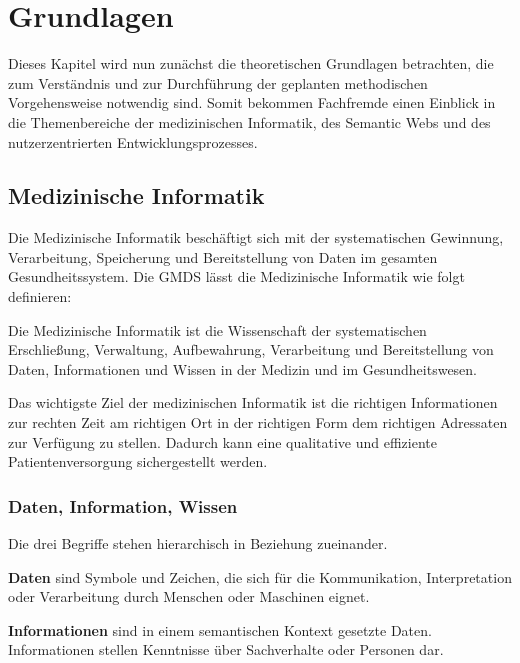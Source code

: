 \chapter{Grundlagen}\label{ch:preliminaries}

Dieses Kapitel wird nun zunächst die theoretischen Grundlagen betrachten, die zum Verständnis und zur Durchführung der geplanten methodischen Vorgehensweise notwendig sind.
Somit bekommen Fachfremde einen Einblick in die Themenbereiche der medizinischen Informatik, des Semantic Webs und des nutzerzentrierten Entwicklungsprozesses.

\section{Medizinische Informatik}\label{sec:mi}

Die Medizinische Informatik beschäftigt sich mit der systematischen Gewinnung, Verarbeitung, Speicherung und Bereitstellung von Daten im gesamten Gesundheitssystem. 
Die \ac{GMDS} lässt die Medizinische Informatik wie folgt definieren:

\begin{definition}
	Die Medizinische Informatik ist die Wissenschaft der systematischen Erschließung, Verwaltung, Aufbewahrung, Verarbeitung und Bereitstellung von Daten, Informationen und 			Wissen in der Medizin und im Gesundheitswesen.
\end{definition}

Das wichtigste Ziel der medizinischen Informatik ist die richtigen Informationen zur rechten Zeit am richtigen Ort in der richtigen Form dem richtigen Adressaten zur Verfügung zu stellen. 
Dadurch kann eine qualitative und effiziente Patientenversorgung sichergestellt werden. \citep[vgl.]{winter_health_2011}

\subsection{Daten, Information, Wissen}

Die drei Begriffe stehen hierarchisch in Beziehung zueinander.

\textbf{Daten} sind Symbole und Zeichen, die sich für die Kommunikation, Interpretation oder Verarbeitung durch Menschen oder Maschinen eignet.

\textbf{Informationen} sind in einem semantischen Kontext gesetzte Daten.
Informationen stellen Kenntnisse über Sachverhalte oder Personen dar.

